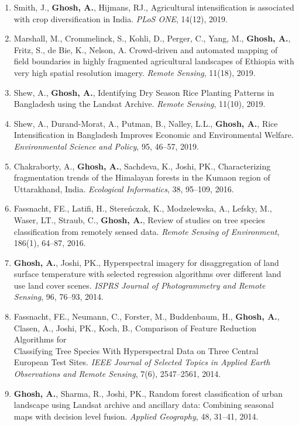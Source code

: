 \documentclass[11pt]{article}
\makeatletter
\newlength{\bibhang}
\newlength{\bibsep}
 {\@listi \global\bibsep\itemsep \global\advance\bibsep by\parsep}
\newenvironment{bibsection}%
        {\begin{enumerate}{}{%
       \setlength{\leftmargin}{\bibhang}%
       \setlength{\itemindent}{-\leftmargin}%
       \setlength{\itemsep}{\bibsep}%
       \setlength{\parsep}{\z@}%
        \setlength{\partopsep}{0pt}%
        \setlength{\topsep}{0pt}}}
        {\end{enumerate}\vspace{-.6\baselineskip}}
\makeatother
\begin{document}
\vspace{-.1275in}
\begin{bibsection}
    \item Smith, J., {\bf Ghosh, A.}, Hijmans, RJ., Agricultural intensification is associated with crop diversification in India. \emph{PLoS ONE}, 14(12), 2019.
    \item Marshall, M., Crommelinck, S., Kohli, D., Perger, C., Yang, M., {\bf Ghosh, A.}, Fritz, S., de Bie, K., Nelson, A. Crowd-driven and automated mapping of field boundaries in highly fragmented agricultural landscapes of Ethiopia with very high spatial resolution imagery. \emph{Remote Sensing}, 11(18), 2019.
    \item Shew, A., {\bf Ghosh, A.}, Identifying Dry Season Rice Planting Patterns in Bangladesh using the Landsat Archive. \emph{Remote Sensing}, 11(10), 2019.
    \item Shew, A., Durand-Morat, A., Putman, B., Nalley, L.L., {\bf Ghosh, A.}, Rice Intensification in Bangladesh Improves Economic and Environmental Welfare. \emph{Environmental Science and Policy}, 95, 46--57, 2019.
    \item Chakraborty, A., {\bf Ghosh, A.}, Sachdeva, K., Joshi, PK., Characterizing \\fragmentation trends of the Himalayan forests in the Kumaon region of Uttarakhand, India. \emph{Ecological Informatics}, 38, 95--109, 2016.
    \item Fassnacht, FE., Latifi, H., Stere{\'n}czak, K., Modzelewska, A., Lefsky, M., Waser, LT., Straub, C., {\bf Ghosh, A.}, Review of studies on tree species classification from remotely sensed data. \emph{Remote Sensing of Environment}, 186(1), 64--87, 2016.
    \item {\bf Ghosh, A.}, Joshi, PK., Hyperspectral imagery for disaggregation of land surface temperature with selected regression algorithms over different land use land cover scenes. \emph{ISPRS Journal of Photogrammetry and Remote Sensing}, 96, 76--93, 2014.
    \item Fassnacht, FE., Neumann, C., Forster, M., Buddenbaum, H., {\bf Ghosh, A.}, Clasen, A., Joshi, PK., Koch, B., Comparison of Feature Reduction Algorithms for\\ Classifying Tree Species With Hyperspectral Data on Three Central European Test Sites. \emph{IEEE Journal of Selected Topics in Applied Earth Observations and Remote Sensing}, 7(6), 2547--2561, 2014.
    \item {\bf Ghosh, A.}, Sharma, R., Joshi, PK., Random forest classification of urban landscape using Landsat archive and ancillary data: Combining seasonal maps with decision level fusion. \emph{Applied Geography}, 48, 31--41, 2014.

\end{bibsection}
\end{document}
